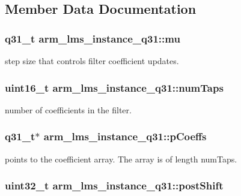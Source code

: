 \subsection{Member Data Documentation}
\hypertarget{structarm__lms__instance__q31_acb6ca9996b3c5f740d5d6c8e9f4f1d46}{
\subsubsection[{mu}]{\setlength{\rightskip}{0pt plus 5cm}q31\-\_\-t arm\-\_\-lms\-\_\-instance\-\_\-q31\-::mu}}\label{structarm__lms__instance__q31_acb6ca9996b3c5f740d5d6c8e9f4f1d46}
step size that controls filter coefficient updates. \hypertarget{structarm__lms__instance__q31_ac0d84f7d054555931ef8a62511fbcb8a}{
\subsubsection[{num\-Taps}]{\setlength{\rightskip}{0pt plus 5cm}uint16\-\_\-t arm\-\_\-lms\-\_\-instance\-\_\-q31\-::num\-Taps}}\label{structarm__lms__instance__q31_ac0d84f7d054555931ef8a62511fbcb8a}
number of coefficients in the filter. \hypertarget{structarm__lms__instance__q31_a4afe56e991a5416adfd462aa88bda500}{
\subsubsection[{p\-Coeffs}]{\setlength{\rightskip}{0pt plus 5cm}q31\-\_\-t$\ast$ arm\-\_\-lms\-\_\-instance\-\_\-q31\-::p\-Coeffs}}\label{structarm__lms__instance__q31_a4afe56e991a5416adfd462aa88bda500}
points to the coefficient array. The array is of length num\-Taps. \hypertarget{structarm__lms__instance__q31_a4705a8f0011bb9166e09bf5bd51e595e}{
\subsubsection[{post\-Shift}]{\setlength{\rightskip}{0pt plus 5cm}uint32\-\_\-t arm\-\_\-lms\-\_\-instance\-\_\-q31\-::post\-Shift}}\label{structarm__lms__instance__q31_a4705a8f0011bb9166e09bf5bd51e595e}
